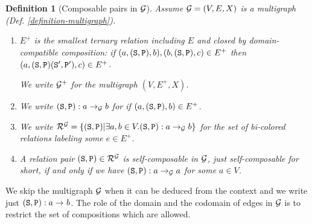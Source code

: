 \documentclass{lmcs}
\newtheorem{definition}[theorem]{Definition}
\begin{document}
\begin{definition}[Composable pairs  in $\setG$]
Assume $\setG=(V,E,X)$ is a multigraph  (Def. \ref{definition-multigraph}).

\begin{enumerate}

\item
$E^+$ is the smallest ternary relation including $E$ and closed
by domain-compatible composition: 
if $(a,(\Stat,\Prog),b),  (b,(\Stat,\Prog),c)\in E^+$ then  
$(a,(\Stat,\Prog)(\Stat',\Prog'),c) \in E^+$.

We write $\setG^+$ for the multigraph $(V,E^+,X)$.

\item
We write  $\composable{\setG}{a}{b}{(\Stat,\Prog)}$
for if $(a,(\Stat,\Prog),b) \in E^+$.

\item
We write 
$
\setR^\setG 
=  
\{(\Stat,\Prog) | \exists a,b \in V. \composable{\setG}{a}{b}{(\Stat,\Prog)} \}
$
for the set of bi-colored relations labeling some $e \in E^+$.


\item
A relation pair $(\Stat,\Prog) \in \setR^\setG$
is \emph{self-composable in $\setG$}, just \emph{self-composable}
for short, if and only if we have 
$\composable {\setG} {a} {a} {(\Stat,\Prog)}$ for some $a \in V$.

\end{enumerate}

\end{definition}

We skip the multigraph $\setG$ when it can be deduced from the context
and we write just $\composable{}{a}{b}{(\Stat,\Prog)}$.
The role of the domain and the codomain of edges in 
$\setG$ is to restrict the set of compositions which are allowed.

\end{document}
